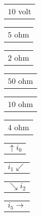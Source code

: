 \documentclass{book}
\begin{document}
\stopmpxshipout
\mpxshipout%
{\small \renewcommand{\arraystretch}{.9}
                \circuitfont\begin{tabular}{@{}l}
                   $10$ volt 
	        \end{tabular}}%
\stopmpxshipout
\mpxshipout%
{\small \renewcommand{\arraystretch}{.9}
              \circuitfont\begin{tabular}[t]{@{}r@{}}
                  $5$ ohm    
              \end{tabular}}%
\stopmpxshipout
\mpxshipout%
{\small \renewcommand{\arraystretch}{.9}
              \circuitfont\begin{tabular}[t]{@{}l@{}}
                  $2$ ohm    
              \end{tabular}}%
\stopmpxshipout
\mpxshipout%
{\small \renewcommand{\arraystretch}{.9}
              \circuitfont\begin{tabular}[b]{@{}c@{}}
                  $50$ ohm    
              \end{tabular}}%
\stopmpxshipout
\mpxshipout%
{\small \renewcommand{\arraystretch}{.9}
              \circuitfont\begin{tabular}[t]{@{}r@{}}
                  $10$ ohm    
              \end{tabular}}%
\stopmpxshipout
\mpxshipout%
{\small \renewcommand{\arraystretch}{.9}
              \circuitfont\begin{tabular}[t]{@{}l@{}}
                  $4$ ohm    
              \end{tabular}}%
\stopmpxshipout
\mpxshipout%
{\small \renewcommand{\arraystretch}{.9}
              \circuitfont\begin{tabular}{@{}l}
                 $\uparrow i_0$  
	      \end{tabular}}%
\stopmpxshipout
\mpxshipout%
{\small \renewcommand{\arraystretch}{.9}
              \begin{tabular}[t]{@{}r@{}}
                  $i_1 \swarrow$    
              \end{tabular}}%
\stopmpxshipout
\mpxshipout%
{\small \renewcommand{\arraystretch}{.9}
              \begin{tabular}[t]{@{}l@{}}
                  $\searrow i_2$    
              \end{tabular}}%
\stopmpxshipout
\mpxshipout%
{\small \renewcommand{\arraystretch}{.9}
              \begin{tabular}[b]{@{}c@{}}
                  $i_5\rightarrow$     
              \end{tabular}}%
\end{document}
